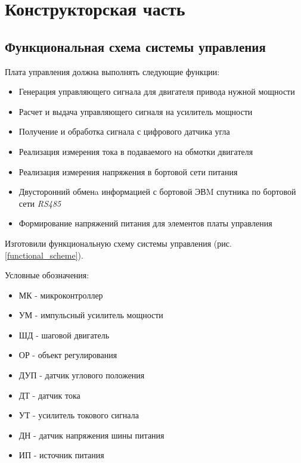 \clearpage
\section{Конструкторская часть}

\subsection{Функциональная схема системы управления}
Плата управления должна выполнять следующие функции:
\begin{itemize}
    \item Генерация управляющего сигнала для двигателя привода нужной мощности
    \item Расчет и выдача управляющего сигналя на усилитель мощности
    \item Получение и обработка сигнала с цифрового датчика угла
    \item Реализация измерения тока в подаваемого на обмотки двигателя
    \item Реализация измерения напряжения в бортовой сети питания
    \item Двусторонний обменa информацией с бортовой ЭВM спутника по бортовой
            сети \textit{RS485}
    \item Формирование напряжений питания для элементов платы управления
\end{itemize}

Изготовили функциональную схему системы управления
(рис. \ref{functional_scheme}).

Условные обозначения:
\begin{itemize}
    \item МК - микроконтроллер
    \item УМ - импульсный усилитель мощности
    \item ШД - шаговой двигатель
    \item ОР - объект регулирования
    \item ДУП - датчик углового положения
    \item ДТ - датчик тока
    \item УТ - усилитель токового сигнала
    \item ДН - датчик напряжения шины питания
    \item ИП - источник питания
\end{itemize}

